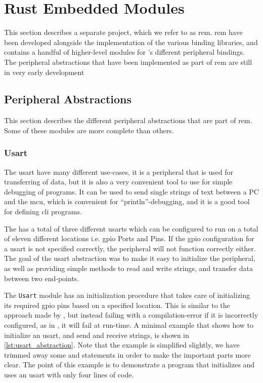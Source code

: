 
\section{Rust Embedded Modules}
\label{sec:rust-embedded-modules}

This section describes a separate project, which we refer to as \gls{rem}.
\gls{rem} have been developed alongside the implementation of the various binding libraries, and contains a handful of higher-level modules for {\emlib}'s different peripheral bindings.
The peripheral abstractions that have been implemented as part of \gls{rem} are still in very early development

\subsection{Peripheral Abstractions}
\label{sub:peripheral_abstractions}


This section describes the different peripheral abstractions that are part of \gls{rem}.
Some of these modules are more complete than others.

\subsubsection{Usart}
\label{ssub:usart}

The \gls{usart} have many different use-cases, it is a peripheral that is used for transferring of data, but it is also a very convenient tool to use for simple debugging of programs.
It can be used to send single strings of text between a PC and the \gls{mcu}, which is convenient for ``println''-debugging, and it is a good tool for defining \gls{cli} programs.

The {\gecko} has a total of three different \glspl{usart} which can be configured to run on a total of eleven different locations i.e. \gls{gpio} Ports and Pins.
If the \gls{gpio} configuration for a \gls{usart}  is not specified correctly, the peripheral will not function correctly either.
The goal of the \gls{usart} abstraction was to make it easy to initialize the peripheral, as well as providing simple methods to read and write strings, and transfer data between two end-points.

The \texttt{Usart} module has an initialization procedure that takes care of initializing its required \gls{gpio} pins based on a specified location.
This is similar to the approach made by {\zinc}, but instead failing with a compilation-error if it is incorrectly configured, as in {\zinc}, it will fail at run-time.
A minimal example that shows how to initialize an \gls{usart}, and send and receive strings, is shown in \autoref{lst:usart_abstraction}.
Note that the example is simplified slightly, we have trimmed away some  and  statements in order to make the important parts more clear.
The point of this example is to demonstrate a program that initializes and uses an \gls{usart} with only four lines of code.

